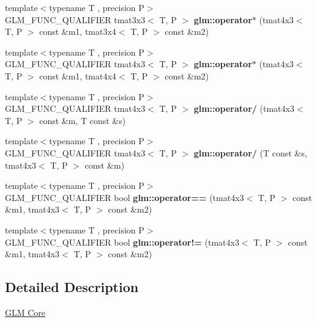 \begin{DoxyCompactItemize}
\item 
\mbox{\label{type__mat4x3_8inl_a1364c0e61de6a2c9a51c10c390cb0d99}} 
{\footnotesize template$<$typename T , precision P$>$ }\\G\+L\+M\+\_\+\+F\+U\+N\+C\+\_\+\+Q\+U\+A\+L\+I\+F\+I\+ER tmat3x3$<$ T, P $>$ {\bfseries glm\+::operator$\ast$} (tmat4x3$<$ T, P $>$ const \&m1, tmat3x4$<$ T, P $>$ const \&m2)
\item 
\mbox{\label{type__mat4x3_8inl_abd440e86d32d7fdf501cea387d566799}} 
{\footnotesize template$<$typename T , precision P$>$ }\\G\+L\+M\+\_\+\+F\+U\+N\+C\+\_\+\+Q\+U\+A\+L\+I\+F\+I\+ER tmat4x3$<$ T, P $>$ {\bfseries glm\+::operator$\ast$} (tmat4x3$<$ T, P $>$ const \&m1, tmat4x4$<$ T, P $>$ const \&m2)
\item 
\mbox{\label{type__mat4x3_8inl_ae7004574df6323d999b0a1be72ac72d6}} 
{\footnotesize template$<$typename T , precision P$>$ }\\G\+L\+M\+\_\+\+F\+U\+N\+C\+\_\+\+Q\+U\+A\+L\+I\+F\+I\+ER tmat4x3$<$ T, P $>$ {\bfseries glm\+::operator/} (tmat4x3$<$ T, P $>$ const \&m, T const \&s)
\item 
\mbox{\label{type__mat4x3_8inl_ad3cad8f5fbca99608719dbab6c2c3537}} 
{\footnotesize template$<$typename T , precision P$>$ }\\G\+L\+M\+\_\+\+F\+U\+N\+C\+\_\+\+Q\+U\+A\+L\+I\+F\+I\+ER tmat4x3$<$ T, P $>$ {\bfseries glm\+::operator/} (T const \&s, tmat4x3$<$ T, P $>$ const \&m)
\item 
\mbox{\label{type__mat4x3_8inl_a26d8f492037c0d9932f3dcdc1f5ad329}} 
{\footnotesize template$<$typename T , precision P$>$ }\\G\+L\+M\+\_\+\+F\+U\+N\+C\+\_\+\+Q\+U\+A\+L\+I\+F\+I\+ER bool {\bfseries glm\+::operator==} (tmat4x3$<$ T, P $>$ const \&m1, tmat4x3$<$ T, P $>$ const \&m2)
\item 
\mbox{\label{type__mat4x3_8inl_ab5df48e5151769b6a258c2c3f2699e9c}} 
{\footnotesize template$<$typename T , precision P$>$ }\\G\+L\+M\+\_\+\+F\+U\+N\+C\+\_\+\+Q\+U\+A\+L\+I\+F\+I\+ER bool {\bfseries glm\+::operator!=} (tmat4x3$<$ T, P $>$ const \&m1, tmat4x3$<$ T, P $>$ const \&m2)
\end{DoxyCompactItemize}


\subsection{Detailed Description}
\hyperlink{group__core}{G\+LM Core} 